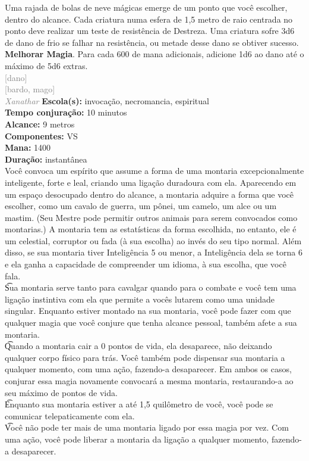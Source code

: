 \documentclass{RPG_Adventure}[2021/10/20]
\begin{document}
{\normalsize Uma rajada de bolas de neve mágicas emerge de um ponto que você escolher, dentro do alcance. Cada criatura numa esfera de 1,5 metro de raio centrada no ponto deve realizar um teste de resistência de Destreza. Uma criatura sofre 3d6 de dano de frio se falhar na resistência, ou metade desse dano se obtiver sucesso.\\\t \textbf{Melhorar Magia}. Para cada 600 de mana adicionais, adicione 1d6 ao dano até o máximo de 5d6 extras.\\}
{\scriptsize \textcolor{gray}{[dano]\\}}
{\scriptsize \textcolor{gray}{[bardo, mago]\\}}
{\tiny \textcolor{gray}{\textit{Xanathar}}}
{\small \t \textbf{Escola(s):} invocação, necromancia, espiritual\\\t \textbf{Tempo conjuração:} 10 minutos\\\t \textbf{Alcance:} 9 metros\\\t \textbf{Componentes:} VS\\\t \textbf{Mana:} 1400\\\t \textbf{Duração:} instantânea\\}
{\normalsize Você convoca um espírito que assume a forma de uma montaria excepcionalmente inteligente, forte e leal, criando uma ligação duradoura com ela. Aparecendo em um espaço desocupado dentro do alcance, a montaria adquire a forma que você escolher, como um cavalo de guerra, um pônei, um camelo, um alce ou um mastim.  (Seu Mestre pode permitir outros animais para serem convocados como montarias.) A montaria tem as estatísticas da forma escolhida, no entanto, ele é um celestial, corruptor ou fada (à sua escolha) ao invés do seu tipo normal. Além disso, se sua montaria tiver Inteligência 5 ou menor, a Inteligência dela se torna 6 e ela ganha a capacidade de compreender um idioma, à sua escolha, que você fala.\\\t Sua montaria serve tanto para cavalgar quando para o combate e você tem uma ligação instintiva com ela que permite a vocês lutarem como uma unidade singular.  Enquanto estiver montado na sua montaria, você pode fazer com que qualquer magia que você conjure que tenha alcance pessoal, também afete a sua montaria.\\\t Quando a montaria cair a 0 pontos de vida, ela desaparece, não deixando qualquer corpo físico para trás.  Você também pode dispensar sua montaria a qualquer momento, com uma ação, fazendo-a desaparecer. Em ambos os casos, conjurar essa magia novamente convocará a mesma montaria, restaurando-a ao seu máximo de pontos de vida.\\\t Enquanto sua montaria estiver a até 1,5 quilômetro de você, você pode se comunicar telepaticamente com ela.\\\t Você não pode ter mais de uma montaria ligado por essa magia por vez. Com uma ação, você pode liberar a montaria da ligação a qualquer momento, fazendo-a desaparecer.\\}
\end{document}

